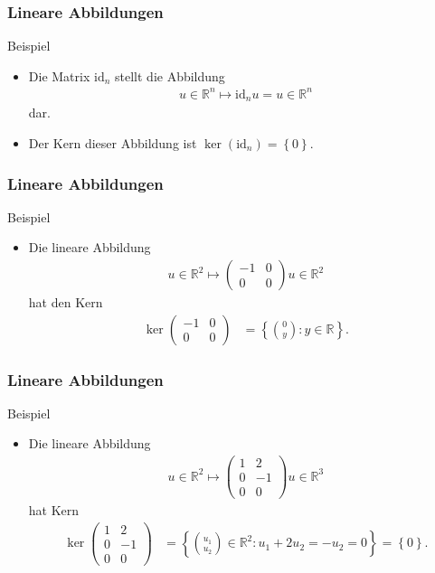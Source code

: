 \documentclass{beamer}
\newcommand\RR{\mathbb R}
\newcommand{\id}{\mathrm{id}}
\newcommand\cbc[1]{\left\{{#1}\right\}}
\newcommand{\mytitle}{Lineare Abbildungen}
\begin{document}
\begin{frame}\frametitle{\mytitle}
	\begin{block}{Beispiel}
		\begin{itemize}
			\item Die Matrix $\id_n$ stellt die Abbildung
				\begin{align*}
					u\in\RR^n\mapsto \id_n u=u\in\RR^n
				\end{align*}
				dar.
			\item Der Kern dieser Abbildung ist $\ker(\id_n)=\cbc0$.
		\end{itemize}
	\end{block}
\end{frame}

\begin{frame}\frametitle{\mytitle}
	\begin{block}{Beispiel}
		\begin{itemize}
			\item Die lineare Abbildung 
				\begin{align*}
					u\in\RR^2\mapsto\begin{pmatrix}-1&0\\0&0\end{pmatrix}u\in\RR^2
				\end{align*}
				hat den Kern
				\begin{align*}
					\ker\begin{pmatrix}-1&0\\0&0\end{pmatrix}&=\cbc{\binom 0y:y\in\RR}.
				\end{align*}
		\end{itemize}
	\end{block}
\end{frame}

\begin{frame}\frametitle{\mytitle}
	\begin{block}{Beispiel}
		\begin{itemize}
			\item Die lineare Abbildung 
				\begin{align*}
					u\in\RR^2\mapsto\begin{pmatrix}1&2\\0&-1\\0&0\end{pmatrix}u\in\RR^3
				\end{align*}
				hat Kern
				\begin{align*}
					\ker\begin{pmatrix}1&2\\0&-1\\0&0\end{pmatrix}&
					=\cbc{\binom{u_1}{u_2}\in\RR^2:u_1+2u_2=-u_2=0}=\cbc{0}.
				\end{align*}
		\end{itemize}
	\end{block}
\end{frame}
\end{document}
